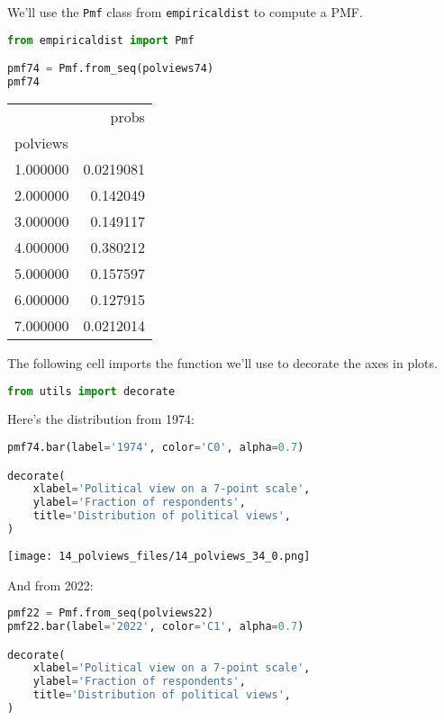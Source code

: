We'll use the \passthrough{\lstinline!Pmf!} class from
\passthrough{\lstinline!empiricaldist!} to compute a PMF.

\begin{lstlisting}[language=Python,style=source]
from empiricaldist import Pmf

pmf74 = Pmf.from_seq(polviews74)
pmf74
\end{lstlisting}

\begin{tabular}{lr}
\midrule
 & probs \\
polviews &  \\
\midrule
1.000000 & 0.0219081 \\
2.000000 & 0.142049 \\
3.000000 & 0.149117 \\
4.000000 & 0.380212 \\
5.000000 & 0.157597 \\
6.000000 & 0.127915 \\
7.000000 & 0.0212014 \\
\midrule
\end{tabular}

The following cell imports the function we'll use to decorate the axes
in plots.

\begin{lstlisting}[language=Python,style=source]
from utils import decorate
\end{lstlisting}

Here's the distribution from 1974:

\begin{lstlisting}[language=Python,style=source]
pmf74.bar(label='1974', color='C0', alpha=0.7)

decorate(
    xlabel='Political view on a 7-point scale',
    ylabel='Fraction of respondents',
    title='Distribution of political views',
)
\end{lstlisting}

\begin{center}
\texttt{[image: 14\_polviews\_files/14\_polviews\_34\_0.png]}
\end{center}

And from 2022:

\begin{lstlisting}[language=Python,style=source]
pmf22 = Pmf.from_seq(polviews22)
pmf22.bar(label='2022', color='C1', alpha=0.7)

decorate(
    xlabel='Political view on a 7-point scale',
    ylabel='Fraction of respondents',
    title='Distribution of political views',
)
\end{lstlisting}

